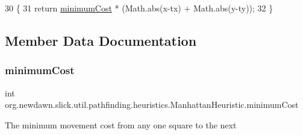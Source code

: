 \begin{DoxyCode}
30                     \{
31         \textcolor{keywordflow}{return} \mbox{\hyperlink{classorg_1_1newdawn_1_1slick_1_1util_1_1pathfinding_1_1heuristics_1_1_manhattan_heuristic_aa9c2d604c30d1ab8c31672ea5daeef40}{minimumCost}} * (Math.abs(x-tx) + Math.abs(y-ty));
32     \}
\end{DoxyCode}


\subsection{Member Data Documentation}
\mbox{\label{classorg_1_1newdawn_1_1slick_1_1util_1_1pathfinding_1_1heuristics_1_1_manhattan_heuristic_aa9c2d604c30d1ab8c31672ea5daeef40}} 
\subsubsection{\texorpdfstring{minimum\+Cost}{minimumCost}}
{\footnotesize\ttfamily int org.\+newdawn.\+slick.\+util.\+pathfinding.\+heuristics.\+Manhattan\+Heuristic.\+minimum\+Cost\hspace{0.3cm}{\ttfamily [private]}}

The minimum movement cost from any one square to the next 
